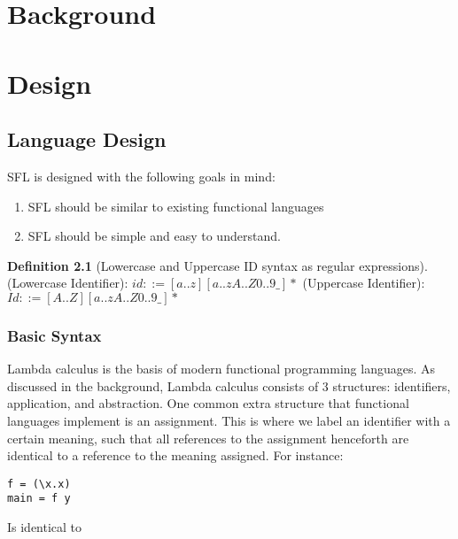 \documentclass[
author=Kiran Sturt,
degree=BSc,
title=Implementing a Step by Step Evaluator for a Simple Functional Programming language,
unit=COMS30045,twoside]{dissertation}
\theoremstyle{definition}
\theoremstyle{break}
\newtheorem{syntax}{Definition}
\theoremstyle{definition}
\begin{document}

\chapter{Background}
\label{chap:technical}


\chapter{Design}
\label{chap:design}

\section{Language Design}
SFL is designed with the following goals in mind:
\begin{enumerate}
    \item SFL should be similar to existing functional languages
    \item SFL should be simple and easy to understand. 
\end{enumerate}

\begin{syntax}[Lowercase and Uppercase ID syntax as regular expressions]
\label{def:identifier_syntax}
(Lowercase Identifier): \(id ::= [a..z][a..zA..Z0..9\_]*\)\newline
(Uppercase Identifier): \(Id ::= [A..Z][a..zA..Z0..9\_]*\)
\end{syntax}

\subsection{Basic Syntax}
Lambda calculus is the basis of modern functional programming languages. As discussed in the background, Lambda calculus consists of 3 structures: identifiers, application, and abstraction. One common extra structure that functional languages implement is an assignment. This is where we label an identifier with a certain meaning, such that all references to the assignment henceforth are identical to a reference to the meaning assigned. For instance:

\begin{lstlisting}[]
f = (\x.x)
main = f y
\end{lstlisting}

Is identical to
\end{document}
